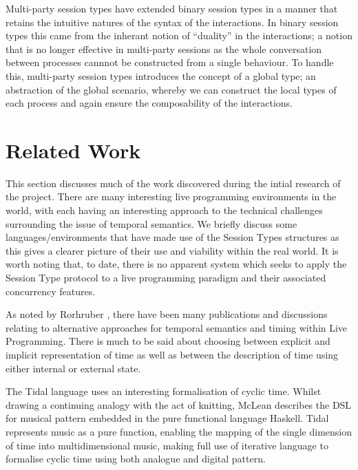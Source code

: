 \documentclass[11pt, abstracton, twoside, titlepage=true]{scrartcl}
\begin{document}
Multi-party session types have extended binary session types in a manner
that retains the intuitive natures of the syntax of the interactions. In
binary session types this came from the inherant notion of ``duality'' in
the interactions; a notion that is no longer effective in multi-party 
sessions as the whole conversation between processes cannnot be constructed
from a single behaviour. To handle this, multi-party session types
introduces the concept of a global type; an abstraction of the global
scenario, whereby we can construct the local types of each process and
again ensure the composability of the interactions\cite{HYC08}. 
\newpage

\section{Related Work}
\thispagestyle{empty}
This section discusses much of the work discovered during the intial research 
of the project. There are many interesting live programming environments in
the world, with each having an interesting approach to the technical 
challenges surrounding the issue of temporal semantics. We briefly discuss 
some languages/environments that have made use of the Session Types structures 
as this gives a clearer picture of their use and 
viability within the real world. It is worth noting that, to date, there is no 
apparent system which seeks to apply the Session Type protocol to a live 
programming paradigm and their associated concurrency features.

As noted by Rorhruber \cite{BMNR14}, there have been many publications and 
discussions relating to alternative approaches for temporal semantics and 
timing within Live Programming. There is much to be said about choosing 
between explicit and implicit representation of time as well as between the 
description of time using either internal or external state.

The Tidal language \cite{McL13} uses an interesting formalisation of cyclic 
time. Whilst drawing a continuing analogy with the act of knitting, McLean 
describes the DSL for musical pattern embedded in the pure functional language 
Haskell. Tidal represents music as a pure function, enabling the mapping of 
the single dimension of time into multidimensional music, making full use of 
iterative language to formalise cyclic time using both analogue and digital 
pattern.
\end{document}
